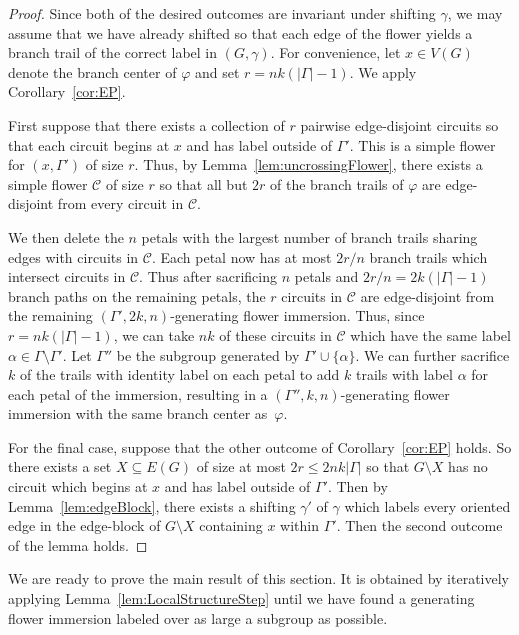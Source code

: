 \documentclass[11pt]{article}
\theoremstyle{definition}
\newcommand{\C}{\mathcal{C}}
\begin{document}
\begin{proof}
    Since both of the desired outcomes are invariant under shifting $\gamma$, we may assume that we have already shifted so that each edge of the flower yields a branch trail of the correct label in $(G, \gamma)$. For convenience, let $x \in V(G)$ denote the branch center of $\varphi$ and set $r = nk(|\Gamma|-1)$. We apply Corollary~\ref{cor:EP}.
    
    First suppose that there exists a collection of $r$ pairwise edge-disjoint circuits so that each circuit begins at $x$ and has label outside of $\Gamma'$. This is a simple flower for $(x, \Gamma')$ of size $r$. Thus, by Lemma~\ref{lem:uncrossingFlower}, there exists a simple flower $\C$ of size $r$ so that all but $2r$ of the branch trails of $\varphi$ are edge-disjoint from every circuit in $\C$. 
    
    We then delete the $n$ petals with the largest number of branch trails sharing edges with circuits in $\C$. Each petal now has at most $2r/n$ branch trails which intersect circuits in $\C$. Thus after sacrificing $n$ petals and $2r/n=2k(|\Gamma|-1)$ branch paths on the remaining petals, the $r$ circuits in $\C$ are edge-disjoint from the remaining $(\Gamma', 2k, n)$-generating flower immersion. Thus, since $r=nk(|\Gamma|-1)$, we can take $nk$ of these circuits in $\C$ which have the same label $\alpha \in \Gamma \setminus \Gamma'$. Let $\Gamma''$ be the subgroup generated by $\Gamma' \cup \{\alpha\}$. We can further sacrifice $k$ of the trails with identity label on each petal to add $k$ trails with label $\alpha$ for each petal of the immersion, resulting in a $(\Gamma'', k, n)$-generating flower immersion with the same branch center as~$\varphi$.

    For the final case, suppose that the other outcome of Corollary~\ref{cor:EP} holds. So there exists a set $X \subseteq E(G)$ of size at most $2r\leq 2nk|\Gamma|$ so that $G\setminus X$ has no circuit which begins at $x$ and has label outside of $\Gamma'$. Then by Lemma~\ref{lem:edgeBlock}, there exists a shifting $\gamma'$ of $\gamma$ which labels every oriented edge in the edge-block of $G\setminus X$ containing $x$ within $\Gamma'$. Then the second outcome of the lemma holds.
\end{proof}

We are ready to prove the main result of this section. It is obtained by iteratively applying Lemma~\ref{lem:LocalStructureStep} until we have found a generating flower immersion labeled over as large a subgroup as possible. 
\end{document}
